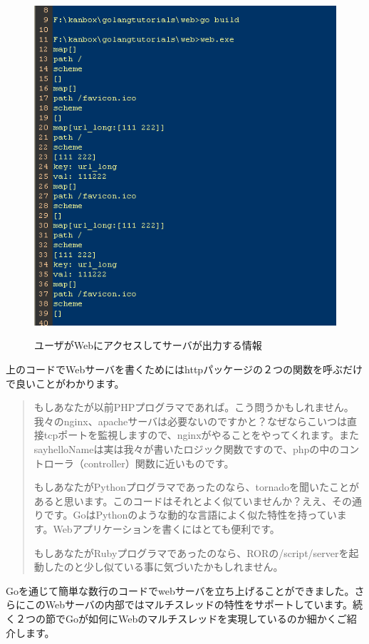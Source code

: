 \begin{figure}[H]
  \includegraphics[width=14cm]{3.2.goweb.png}
   \label{図3.8}
   \caption{ユーザがWebにアクセスしてサーバが出力する情報}
\end{figure}

上のコードでWebサーバを書くためにはhttpパッケージの２つの関数を呼ぶだけで良いことがわかります。


\begin{quote}
もしあなたが以前PHPプログラマであれば。こう問うかもしれません。我々のnginx、apacheサーバは必要ないのですかと？なぜならこいつは直接tcpポートを監視しますので、nginxがやることをやってくれます。またsayhelloNameは実は我々が書いたロジック関数ですので、phpの中のコントローラ（controller）関数に近いものです。

もしあなたがPythonプログラマであったのなら、tornadoを聞いたことがあると思います。このコードはそれとよく似ていませんか？ええ、その通りです。GoはPythonのような動的な言語によく似た特性を持っています。Webアプリケーションを書くにはとても便利です。

もしあなたがRubyプログラマであったのなら、RORの/script/serverを起動したのと少し似ている事に気づいたかもしれません。
\end{quote}


Goを通じて簡単な数行のコードでwebサーバを立ち上げることができました。さらにこのWebサーバの内部ではマルチスレッドの特性をサポートしています。続く２つの節でGoが如何にWebのマルチスレッドを実現しているのか細かくご紹介します。
